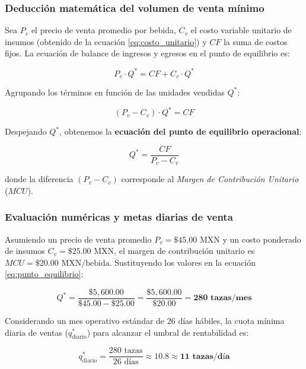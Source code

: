 \documentclass{article}
\begin{document}
\subsubsection{Deducción matemática del volumen de venta mínimo}

Sea $P_v$ el precio de venta promedio por bebida, $C_v$ el costo variable unitario de insumos (obtenido de la ecuación \ref{eq:costo_unitario}) y $CF$ la suma de costos fijos. La ecuación de balance de ingresos y egresos en el punto de equilibrio es:

\begin{equation}
	P_v \cdot Q^* = CF + C_v \cdot Q^*
\end{equation}

Agrupando los términos en función de las unidades vendidas $Q^*$:

\begin{equation}
	(P_v - C_v) \cdot Q^* = CF
\end{equation}

Despejando $Q^*$, obtenemos la \textbf{ecuación del punto de equilibrio operacional}:

\begin{equation}
	Q^* = \frac{CF}{P_v - C_v} \label{eq:punto_equilibrio}
\end{equation}

donde la diferencia $(P_v - C_v)$ corresponde al \emph{Margen de Contribución Unitario} ($MCU$).

\subsubsection{Evaluación numéricas y metas diarias de venta}

Asumiendo un precio de venta promedio $P_v = \$45.00\text{ MXN}$ y un costo ponderado de insumos $C_v = \$25.00\text{ MXN}$, el margen de contribución unitario es $MCU = \$20.00\text{ MXN/bebida}$. Sustituyendo los valores en la ecuación \ref{eq:punto_equilibrio}:

\begin{equation}
	Q^* = \frac{\$5,600.00}{\$45.00 - \$25.00} = \frac{\$5,600.00}{\$20.00} = \mathbf{280\text{ tazas/mes}}
\end{equation}

Considerando un mes operativo estándar de 26 días hábiles, la cuota mínima diaria de ventas ($q^*_{\text{diario}}$) para alcanzar el umbral de rentabilidad es:

\begin{equation}
	q^*_{\text{diario}} = \frac{280\text{ tazas}}{26\text{ días}} \approx \mathbf{10.8 \approx 11\text{ tazas/día}}
\end{equation}
\end{document}
